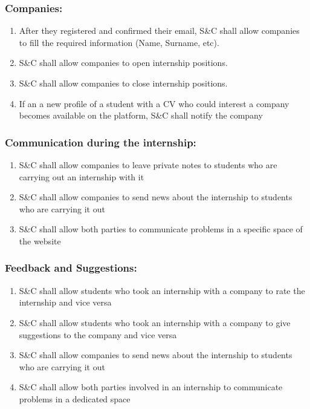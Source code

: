     \subsubsection*{Companies:}
        \begin{enumerate}[label=\textbf{R\arabic*},resume]
            \item After they registered and confirmed their email, S\&C shall allow companies to fill the required information (Name, Surname, etc).
            \item S\&C shall allow companies to open internship positions.
            \item S\&C shall allow companies to close internship positions.
            \item If an a new profile of a student with a CV who could interest a company becomes available on the platform, S\&C shall notify the company
        \end{enumerate}
    
    \subsubsection*{Communication during the internship:}
         \begin{enumerate}[label=\textbf{R\arabic*},resume]
            \item S\&C shall allow companies to leave private notes to students who are carrying out an internship with it
            \item S\&C shall allow companies to send news about the internship to students who are carrying it out
            \item S\&C shall allow both parties to communicate problems in a specific space of the website
        \end{enumerate}
    
    \subsubsection*{Feedback and Suggestions:}
        \begin{enumerate}[label=\textbf{R\arabic*},resume]
            \item S\&C shall allow students who took an internship with a company to rate the internship and vice versa
            \item S\&C shall allow students who took an internship with a company to give suggestions to the company and vice versa
            \item S\&C shall allow companies to send news about the internship to students who are carrying it out
            \item S\&C shall allow both parties involved in an internship to communicate problems in a dedicated space
        \end{enumerate}
